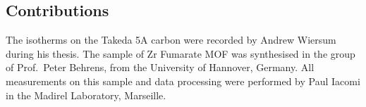 \subsection*{Contributions}

The isotherms on the Takeda 5A carbon were recorded by
Andrew Wiersum during his thesis.
The sample of Zr Fumarate MOF was synthesised in the group
of Prof.\ Peter Behrens, from the University of Hannover,
Germany. All measurements on this sample and data processing were
performed by Paul Iacomi in the Madirel Laboratory, Marseille.